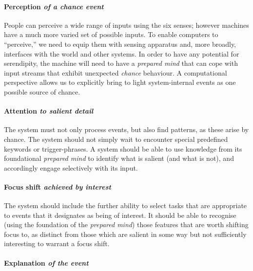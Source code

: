 \paragraph{Perception \emph{of a chance event}}

People can perceive a wide range of inputs using the six senses;
however machines have a much more varied set of possible inputs. To
enable computers to ``perceive,'' we need to equip them with sensing
apparatus and, more broadly, interfaces with the world and other
systems.  In order to have any potential for serendipity, the machine
will need to have a \emph{prepared mind} that can cope with input
streams that exhibit unexpected \emph{chance} behaviour.
A computational perspective
allows us to explicitly bring to light system-internal events as one
possible source of chance.

\paragraph{Attention \emph{to salient detail}}

The system must not only process events, but also find patterns, as
these arise by chance.  The system should not simply wait to encounter
special predefined keywords or trigger-phrases.  A system should be
able to use knowledge from its foundational {\em prepared mind} to
identify what is salient (and what is not), and accordingly engage
selectively with its input.

\paragraph{Focus shift \emph{achieved by interest}}

The system should include the further ability to select tasks that are
appropriate to events that it designates as being of interest.  It
should be able to recognise (using the foundation of the
\emph{prepared mind}) those features that are worth shifting focus to,
as distinct from those which are salient in some way but not
sufficiently interesting to warrant a focus shift.

\paragraph{Explanation \emph{of the event}}

